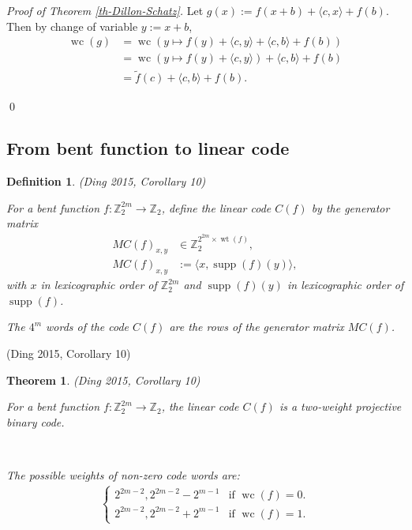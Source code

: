 \documentclass[12pt,a4paper]{article}
\newcommand{\mb}[1]{\mathbb{#1}}
\newcommand{\Z}{\mb{Z}}
\newcommand{\To}{\rightarrow}
\newcommand{\slidecite}[1]{\tiny{(#1)}\normalsize{}}
\newcommand{\smallcite}[1]{\small{(#1)}\normalsize{}}
\newcommand{\dual}[1]{\widetilde{#1}}
\newcommand{\support}[1]{\operatorname{supp}\left(#1\right)}
\newcommand{\weight}[1]{\operatorname{wt}\left(#1\right)}
\newcommand{\weightclass}[1]{\operatorname{wc}\left(#1\right)}
\newtheorem{Theorem}{Theorem}
\newtheorem{Definition}{Definition}
\newenvironment{proofof}[1]{\noindent\emph{Proof of #1.}}{\qed}
\begin{document}
\begin{proofof}{Theorem \ref{th-Dillon-Schatz}}
Let $g(x) := f(x+b) + \langle c, x \rangle + f(b)$.
Then by change of variable $y:=x+b$,
\begin{align*}
\weightclass{g}
&=
\weightclass{y \mapsto f(y) + \langle c, y \rangle + \langle c, b \rangle + f(b)}
\\
&=
\weightclass{y \mapsto f(y) + \langle c, y \rangle} + \langle c, b \rangle + f(b)
\\
&=
\dual{f}(c) + \langle c, b \rangle + f(b).
\end{align*}

\end{proofof}

\subsection*{From bent function to linear code}
\begin{Definition}

\smallcite{Ding 2015, Corollary 10} 

For a bent function $f : \Z_2^{2m} \To \Z_2$, 
define the linear code $C(f)$ by the generator matrix
\begin{align*}
M C(f)_{x,y} &\in \Z_2^{2^{2m} \times \weight{f}},
\\
M C(f)_{x,y} &:= \langle x, \support{f}(y) \rangle,
\end{align*}
with $x$ in lexicographic order of $\Z_2^{2m}$ 
and $\support{f}(y)$ in lexicographic order of $\support{f}$.

The $4^m$ words of the code $C(f)$ are the rows of the generator matrix $M C(f)$.
\end{Definition}

\slidecite{Ding 2015, Corollary 10} 
 
\begin{Theorem}
\smallcite{Ding 2015, Corollary 10} 

For a bent function $f : \Z_2^{2m} \To \Z_2$, the linear code $C(f)$
is a two-weight projective binary code.

~

The possible weights of non-zero code words are:
\begin{align*}
\begin{cases}
2^{2m-2}, 2^{2m-2} - 2^{m-1} & \text{if~} \weightclass{f}=0.
\\
2^{2m-2}, 2^{2m-2} + 2^{m-1} & \text{if~} \weightclass{f}=1.
\end{cases}
\end{align*}

\end{Theorem}
\end{document}

